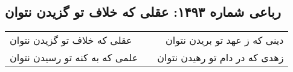 \begin{center}
\section*{رباعی شماره ۱۴۹۳: عقلی که خلاف تو گزیدن نتوان}
\label{sec:1493}
\begin{longtable}{l p{0.5cm} r}
عقلی که خلاف تو گزیدن نتوان
&&
دینی که ز عهد تو بریدن نتوان
\\
علمی که به کنه تو رسیدن نتوان
&&
زهدی که در دام تو رهیدن نتوان
\\
\end{longtable}
\end{center}
